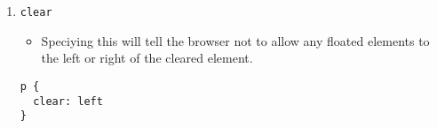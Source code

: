 \documentclass[12pt]{article}
\begin{document}
\begin{enumerate}
\item{\texttt{clear}}
\begin{itemize}
    \item Speciying this will tell the browser not to allow any floated elements to the left or right of the cleared element.
\end{itemize}    
\begin{lstlisting}[frame=single]
p {
  clear: left
}   
\end{lstlisting}



\end{enumerate}
\end{document}
